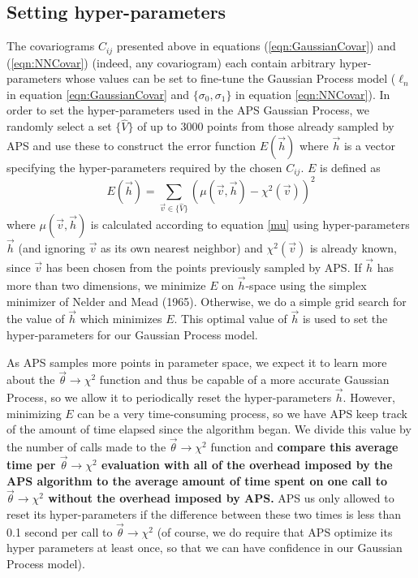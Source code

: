\documentclass[useAMS,usenatbib]{aastex}
\begin{document}
\subsection{Setting hyper-parameters}
\label{sec:hyperparams}

The covariograms $C_{ij}$ presented above in equations (\ref{eqn:GaussianCovar})
and (\ref{eqn:NNCovar}) (indeed, any covariogram)
each contain arbitrary hyper-parameters whose values can be set to fine-tune
the Gaussian Process model ($\ell_n$ in equation \ref{eqn:GaussianCovar}
and $\{\sigma_0,\sigma_1\}$ in equation \ref{eqn:NNCovar}).  
In order to set the hyper-parameters used in the APS Gaussian Process, we randomly
select a set $\{\hat{V}\}$ of up to 3000 points from those already sampled by APS 
and use these to construct
the error function $E(\vec{h})$ where $\vec{h}$ is a vector specifying the hyper-parameters
required by the chosen $C_{ij}$.  $E$ is defined as
\begin{equation}
\label{eqn:hyperparamError}
E(\vec{h})=\sum_{\vec{v}\in\{\hat{V}\}}\left(\mu(\vec{v},\vec{h})-\chi^2(\vec{v})\right)^2
\end{equation}
where $\mu(\vec{v},\vec{h})$ is calculated according to equation \ref{mu} using
hyper-parameters $\vec{h}$ (and ignoring $\vec{v}$ as its own nearest neighbor) and
$\chi^2(\vec{v})$ is already known, since $\vec{v}$ has been chosen from the points previously
sampled by APS.  If $\vec{h}$ has more than two dimensions, we minimize $E$ on $\vec{h}$-space
using the simplex
minimizer of Nelder and Mead (1965).  Otherwise, we do a simple grid search for the value of
$\vec{h}$ which minimizes $E$.  This optimal value of $\vec{h}$ is used to set
the hyper-parameters for our Gaussian Process model.

As APS samples more points in parameter space, we expect it to learn more about the
$\vec{\theta}\rightarrow\chi^2$ function and thus be capable of a more accurate Gaussian
Process, so we allow it to periodically reset the hyper-parameters $\vec{h}$.  However,
minimizing $E$ can be a very time-consuming process, so we have APS keep track of the amount of
time elapsed since the algorithm began.  We divide this value by the number of calls made to
the $\vec{\theta}\rightarrow\chi^2$ function and 
{\bf %
compare this 
average time per $\vec{\theta}\rightarrow\chi^2$ evaluation with all of the overhead
imposed by the APS algorithm to the average
amount of time spent on one call to $\vec{\theta}\rightarrow\chi^2$ without the overhead
imposed by APS. 
}%
APS us only allowed to
reset its hyper-parameters if the difference between these two times is less than 0.1 
second per call to $\vec{\theta}\rightarrow\chi^2$
(of course, we do require that APS optimize its hyper parameters at least once, so that
we can have confidence in our Gaussian Process model).
\end{document}
